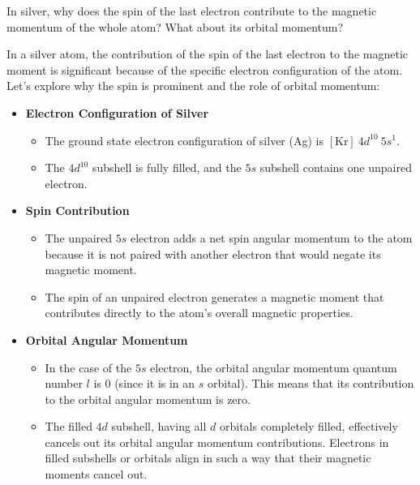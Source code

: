 \begin{ai}
In silver, why does the spin of the last electron contribute to the magnetic momentum of the whole
atom? What about its orbital momentum?
\end{ai}

\begin{airesult}
In a silver atom, the contribution of the spin of the last electron to the magnetic moment is
significant because of the specific electron configuration of the atom. Let's explore why the spin
is prominent and the role of orbital momentum:

\vsp

\begin{itemize}
\item \textbf{Electron Configuration of Silver}

  \begin{itemize}
  \item The ground state electron configuration of silver (Ag) is \([ \text{Kr}] \ 4d^{10} \ 5s^1\).
  \item The \(4d^{10}\) subshell is fully filled, and the \(5s\) subshell contains one unpaired
electron.
  \end{itemize}

\item \textbf{Spin Contribution}

  \begin{itemize}
  \item The unpaired \(5s\) electron adds a net spin angular momentum to the atom because it is not
paired with another electron that would negate its magnetic moment.
  \item The spin of an unpaired electron generates a magnetic moment that contributes directly to
the atom's overall magnetic properties.
  \end{itemize}

\item \textbf{Orbital Angular Momentum}

  \begin{itemize}
  \item In the case of the \(5s\) electron, the orbital angular momentum quantum number \(l\) is 0
(since it is in an \(s\) orbital). This means that its contribution to the orbital angular momentum
is zero.
  \item The filled \(4d\) subshell, having all \(d\) orbitals completely filled, effectively cancels
out its orbital angular momentum contributions. Electrons in filled subshells or orbitals align in
such a way that their magnetic moments cancel out.
  \end{itemize}


\end{itemize}
\end{airesult}
